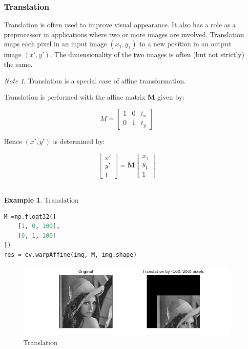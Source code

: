 \documentclass{article}
\theoremstyle{definition}
\newtheorem{ex}{Example}[subsection]
\theoremstyle{remark}
\newtheorem*{nb}{Note}
\begin{document}
\subsubsection{Translation}

Translation is often used to improve visual appearance. It also has a role as a preprocessor in applications where two or more images are involved. Translation maps each pixel in an input image $ (x_1, y_1) $ to a new position in an output image $ (x', y') $. The dimensionality of the two images is often (but not strictly) the same. 

\begin{nb}
Translation is a special case of affine transformation.
\end{nb}

\noindent Translation is performed with the affine matrix $ \pmb{M} $ given by:

\begin{equation}M =
    \begin{bmatrix}
	1 & 0 & t_x \\
	0 & 1 & t_y
    \end{bmatrix}
\end{equation}

\noindent Hence $ (x', y') $ is determined by:

\begin{equation*}
    \begin{bmatrix}
	x' \\
	y' \\
	1
    \end{bmatrix} =  
    \pmb{M}
    \begin{bmatrix}
	x_1 \\
	y_1 \\
	1
    \end{bmatrix}
\end{equation*} \\

\begin{ex} Translation
\begin{lstlisting}[language=Python]
M =np.float32([
    [1, 0, 100],
    [0, 1, 100]
])
res = cv.warpAffine(img, M, img.shape)
\end{lstlisting}
\begin{figure}[h!]
    \centering
    \includegraphics[width=\textwidth]{ocv_gt_translation}
    \caption{Translation}
    \label{fig:ocv_gt_trans}
\end{figure}
\end{ex}
\end{document}
